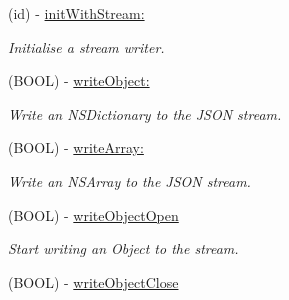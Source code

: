 \begin{DoxyCompactItemize}
\item 
(id) -\/ \hyperlink{interface_s_b_json_stream_writer_a66f11a7df26384bc57389eeb505a8d41}{initWithStream:}
\begin{DoxyCompactList}\small\item\em Initialise a stream writer. \item\end{DoxyCompactList}\item 
\hypertarget{interface_s_b_json_stream_writer_a561990f7d890ffdafdc3f682cacc7211}{
(BOOL) -\/ \hyperlink{interface_s_b_json_stream_writer_a561990f7d890ffdafdc3f682cacc7211}{writeObject:}}
\label{interface_s_b_json_stream_writer_a561990f7d890ffdafdc3f682cacc7211}

\begin{DoxyCompactList}\small\item\em Write an NSDictionary to the JSON stream. \item\end{DoxyCompactList}\item 
\hypertarget{interface_s_b_json_stream_writer_a781a94592da7317105844dfc8c6706cc}{
(BOOL) -\/ \hyperlink{interface_s_b_json_stream_writer_a781a94592da7317105844dfc8c6706cc}{writeArray:}}
\label{interface_s_b_json_stream_writer_a781a94592da7317105844dfc8c6706cc}

\begin{DoxyCompactList}\small\item\em Write an NSArray to the JSON stream. \item\end{DoxyCompactList}\item 
\hypertarget{interface_s_b_json_stream_writer_ab9ff056f3f9f3ad5614163bcf194bbec}{
(BOOL) -\/ \hyperlink{interface_s_b_json_stream_writer_ab9ff056f3f9f3ad5614163bcf194bbec}{writeObjectOpen}}
\label{interface_s_b_json_stream_writer_ab9ff056f3f9f3ad5614163bcf194bbec}

\begin{DoxyCompactList}\small\item\em Start writing an Object to the stream. \item\end{DoxyCompactList}\item 
\hypertarget{interface_s_b_json_stream_writer_a5d5dae8a7c4c4bf8dd2780afa68cd251}{
(BOOL) -\/ \hyperlink{interface_s_b_json_stream_writer_a5d5dae8a7c4c4bf8dd2780afa68cd251}{writeObjectClose}}
\label{interface_s_b_json_stream_writer_a5d5dae8a7c4c4bf8dd2780afa68cd251}


\end{DoxyCompactItemize}

